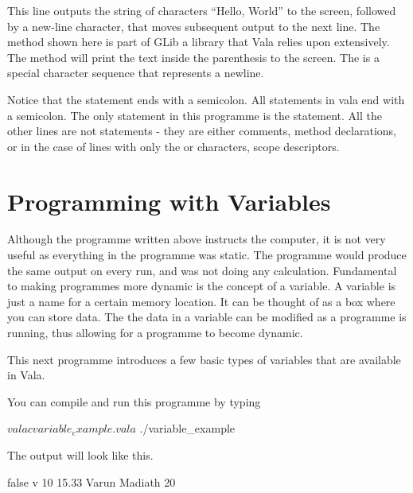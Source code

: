 
This line outputs the string of characters “Hello, World” to the screen, followed by a new-line character, that moves subsequent output to the next line. The  method shown here is part of GLib a library that Vala relies upon extensively. The  method will print the text inside the parenthesis to the screen. The  is a special character sequence that represents a newline.

Notice that the  statement ends with a semicolon. All statements in vala end with a semicolon. The only statement in this programme is the  statement. All the other lines are not statements - they are either comments, method declarations, or in the case of lines with only the \inlinecode{\{} or \inlinecode{\}} characters, scope descriptors.

\section{Programming with Variables}

Although the programme written above instructs the computer, it is not very useful as everything in the programme was static. The programme would produce the same output on every run, and was not doing any calculation. Fundamental to making programmes more dynamic is the concept of a variable. A variable is just a name for a certain memory location. It can be thought of as a box where you can store data. The the data in a variable can be modified as a programme is running, thus allowing for a programme to become dynamic.

This next programme introduces a few basic types of variables that are available in Vala.


You can compile and run this programme by typing

\begin{bashcommands}
$ valac variable_example.vala
$ ./variable_example
\end{bashcommands}

The output will look like this.

\begin{bashcommands}
false
v
10
15.33
Varun Madiath
20
\end{bashcommands}

